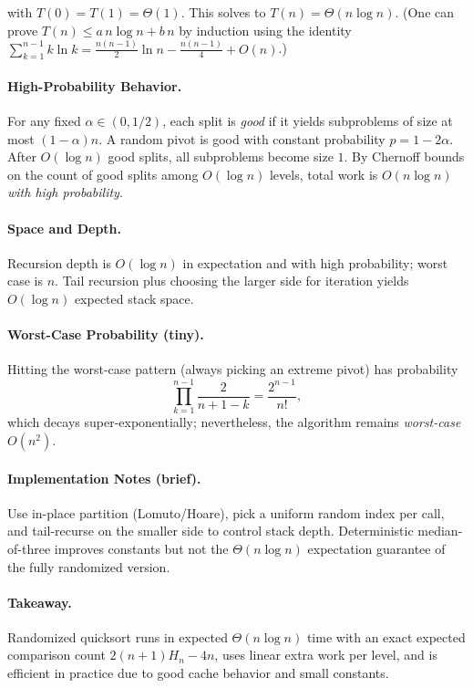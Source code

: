 \documentclass[9pt]{extarticle}
\begin{document}
with $T(0)=T(1)=\Theta(1)$. This solves to $T(n)=\Theta(n\log n)$. (One can prove $T(n)\le a\,n\log n + b\,n$ by induction using the identity $\sum_{k=1}^{n-1}k\ln k = \tfrac{n(n-1)}{2}\ln n - \tfrac{n(n-1)}{4}+O(n)$.)

\paragraph{High-Probability Behavior.}
For any fixed $\alpha\in(0,1/2)$, each split is \emph{good} if it yields subproblems of size at most $(1-\alpha)n$. A random pivot is good with constant probability $p=1-2\alpha$. After $O(\log n)$ good splits, all subproblems become size $1$. By Chernoff bounds on the count of good splits among $O(\log n)$ levels, total work is $O(n\log n)$ \emph{with high probability}.

\paragraph{Space and Depth.}
Recursion depth is $O(\log n)$ in expectation and with high probability; worst case is $n$. Tail recursion plus choosing the larger side for iteration yields $O(\log n)$ expected stack space.

\paragraph{Worst-Case Probability (tiny).}
Hitting the worst-case pattern (always picking an extreme pivot) has probability
\[
\prod_{k=1}^{n-1}\frac{2}{n+1-k}=\frac{2^{n-1}}{n!},
\]
which decays super-exponentially; nevertheless, the algorithm remains \emph{worst-case} $O(n^2)$.

\paragraph{Implementation Notes (brief).}
Use in-place partition (Lomuto/Hoare), pick a uniform random index per call, and tail-recurse on the smaller side to control stack depth. Deterministic median-of-three improves constants but not the $\Theta(n\log n)$ expectation guarantee of the fully randomized version.

\paragraph{Takeaway.}
Randomized quicksort runs in expected $\Theta(n\log n)$ time with an exact expected comparison count $2(n+1)H_n-4n$, uses linear extra work per level, and is efficient in practice due to good cache behavior and small constants.
\end{document}
